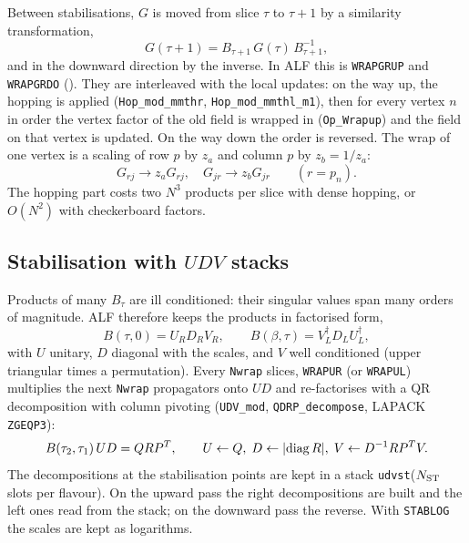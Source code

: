 Between stabilisations, $G$ is moved from slice $\tau$ to $\tau+1$ by a similarity transformation,
\begin{equation}
G(\tau+1) = B_{\tau+1}\,G(\tau)\,B_{\tau+1}^{-1},
\end{equation}
and in the downward direction by the inverse. In ALF this is \texttt{WRAPGRUP} and \texttt{WRAPGRDO} (). They are interleaved with the local updates: on the way up, the hopping is applied (\texttt{Hop\_mod\_mmthr}, \texttt{Hop\_mod\_mmthl\_m1}), then for every vertex $n$ in order the vertex factor of the old field is wrapped in (\texttt{Op\_Wrapup}) and the field on that vertex is updated. On the way down the order is reversed. The wrap of one vertex is a scaling of row $p$ by $z_a$ and column $p$ by $z_b=1/z_a$:
\begin{equation}
G_{rj}\to z_a G_{rj},\quad G_{jr}\to z_b G_{jr}\qquad (r=p_n).
\end{equation}
The hopping part costs two $N^3$ products per slice with dense hopping, or $O(N^2)$ with checkerboard factors.

\subsection{Stabilisation with $UDV$ stacks}

Products of many $B_\tau$ are ill conditioned: their singular values span many orders of magnitude. ALF therefore keeps the products in factorised form,
\begin{equation}
B(\tau,0) = U_R D_R V_R ,\qquad B(\beta,\tau) = V_L^{\dagger} D_L U_L^{\dagger},
\end{equation}
with $U$ unitary, $D$ diagonal with the scales, and $V$ well conditioned (upper triangular times a permutation). Every \texttt{Nwrap} slices, \texttt{WRAPUR} (or \texttt{WRAPUL}) multiplies the next \texttt{Nwrap} propagators onto $U D$ and re-factorises with a QR decomposition with column pivoting (\texttt{UDV\_mod}, \texttt{QDRP\_decompose}, LAPACK \texttt{ZGEQP3}):
\begin{equation}
B(\tau_2,\tau_1)\,U D = Q R P^{T},\qquad U\leftarrow Q,\; D\leftarrow |{\rm diag}\,R|,\; V\leftarrow D^{-1}R P^{T} V .
\end{equation}
The decompositions at the stabilisation points are kept in a stack \texttt{udvst}($N_{\rm ST}$ slots per flavour). On the upward pass the right decompositions are built and the left ones read from the stack; on the downward pass the reverse. With \texttt{STABLOG} the scales are kept as logarithms.

